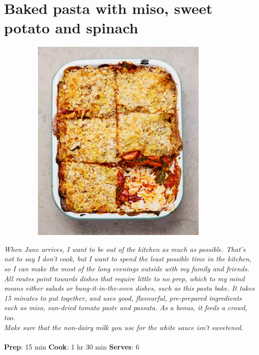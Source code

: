 \documentclass{book}
\begin{document}
\section{Baked pasta with miso, sweet potato and spinach}
\begin{figure}
\centering\includegraphics[width=10cm,height=10cm,keepaspectratio]{Recipe_Pictures/Baked_pasta_with_miso,_sweet_potato_and_spinach.png}
\end{figure}
\emph{When June arrives, I want to be out of the kitchen as much as possible. That’s not to say I don’t cook, but I want to spend the least possible time in the kitchen, so I can make the most of the long evenings outside with my family and friends. All routes point towards dishes that require little to no prep, which to my mind means either salads or bung-it-in-the-oven dishes, such as this pasta bake. It takes 15 minutes to put together, and uses good, flavourful, pre-prepared ingredients such as miso, sun-dried tomato paste and passata. As a bonus, it feeds a crowd, too.\\ 
Make sure that the non-dairy milk you use for the white sauce isn’t sweetened.}\\\\ 
\textbf{Prep}: 15 min
\textbf{Cook}: 1 hr 30 min
\textbf{Serves}: 6
\end{document}

